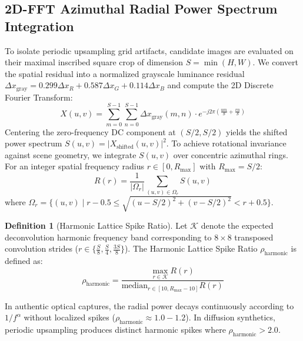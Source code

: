 \documentclass{article}
\theoremstyle{definition}
\newtheorem{definition}{Definition}
\begin{document}
\subsection{2D-FFT Azimuthal Radial Power Spectrum Integration}
To isolate periodic upsampling grid artifacts, candidate images are evaluated on their maximal inscribed square crop of dimension $S = \min(H, W)$. We convert the spatial residual into a normalized grayscale luminance residual $\Delta x_{\text{gray}} = 0.299 \Delta x_R + 0.587 \Delta x_G + 0.114 \Delta x_B$ and compute the 2D Discrete Fourier Transform:
\begin{equation}
X(u, v) = \sum_{m=0}^{S-1} \sum_{n=0}^{S-1} \Delta x_{\text{gray}}(m, n) \cdot e^{-j 2\pi \left( \frac{u m}{S} + \frac{v n}{S} \right)}
\end{equation}
Centering the zero-frequency DC component at $(S/2, S/2)$ yields the shifted power spectrum $S(u, v) = |X_{\text{shifted}}(u, v)|^2$. To achieve rotational invariance against scene geometry, we integrate $S(u, v)$ over concentric azimuthal rings. For an integer spatial frequency radius $r \in [0, R_{\max}]$ with $R_{\max} = S/2$:
\begin{equation}
R(r) = \frac{1}{|\Omega_r|} \sum_{(u, v) \in \Omega_r} S(u, v)
\end{equation}
where $\Omega_r = \{ (u, v) \mid r - 0.5 \le \sqrt{(u - S/2)^2 + (v - S/2)^2} < r + 0.5 \}$.

\begin{definition}[Harmonic Lattice Spike Ratio]
Let $\mathcal{K}$ denote the expected deconvolution harmonic frequency band corresponding to $8\times 8$ transposed convolution strides ($r \in \{ \frac{S}{8}, \frac{S}{4}, \frac{3S}{8} \}$). The Harmonic Lattice Spike Ratio $\rho_{\text{harmonic}}$ is defined as:
\begin{equation}
\rho_{\text{harmonic}} = \frac{\max_{r \in \mathcal{K}} R(r)}{\text{median}_{r \in [10, R_{\max}-10]} R(r)}
\end{equation}
\end{definition}

In authentic optical captures, the radial power decays continuously according to $1/f^\alpha$ without localized spikes ($\rho_{\text{harmonic}} \approx 1.0 - 1.2$). In diffusion synthetics, periodic upsampling produces distinct harmonic spikes where $\rho_{\text{harmonic}} > 2.0$.
\end{document}
